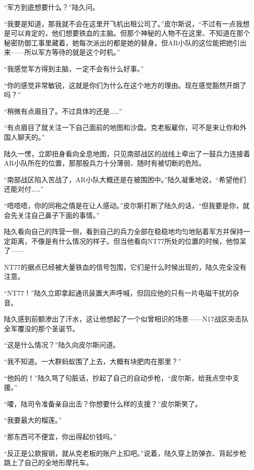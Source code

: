 “军方到底想要什么？”陆久问。

“我要是知道，那我就不会在这里开飞机出租公司了。”皮尔斯说，“不过有一点我想是可以肯定的，他们想要铁血的主脑。但那个神秘的人物不在这里、不知道在那个秘密防御工事里藏着，她每次派出的都是她的替身。但AR小队的这位能把她引出来——所以军方等待的就是这个时机。”

“我感觉军方得到主脑，一定不会有什么好事。”

“你的感觉非常敏锐，这就是你们为什么在这个地方的理由。现在感觉豁然开朗了吗？”

“稍微有点眉目了。不过具体的还是……”

“有点眉目了就关注一下自己面前的地图和沙盘。克老板雇你，可不是来让你和外国人聊天的。”

陆久一愣，立即扭身看向全息地图，只见南部战区的战线上牵出了一鼓兵力连接着AR小队所在的位置，那那股兵力十分薄弱、随时有被切断的危险。

“南部战区陷入苦战了，AR小队大概还是在被围困中。”陆久凝重地说，“希望他们还能对付……”

“唔唔唔，你的同袍之情是在让人感动。”皮尔斯打断了陆久的话，“但我要是你，就会先关注自己鼻子下面的事情。”

陆久看向自己的阵营一侧，看到自己的兵力全部在稳稳地均匀地贴着军方并保持一定距离，不像是有什么情况的样子。但当他看向NT77所处的位置的时候，他惊呆了——

NT77的据点已经被大量铁血的信号包围，它们是什么时候出现的，陆久完全没有注意。

“NT77！”陆久立即拿起通讯装置大声呼喊，但回应他的只有一片电磁干扰的杂音。

陆久感到前额渗出了汗水，这让他想起了一个似曾相识的场景——N17战区突击队全军覆没的那个圣诞节。

“这是什么情况？”陆久向皮尔斯问道。

“我不知道。一大群蚂蚁围了上去，大概有块肥肉在那里？”

“他妈的！”陆久骂了句脏话，抄起了自己的自动步枪，“皮尔斯，给我点空中支援。”

“嚯，陆司令准备亲自出击？你想要什么样的支援？”皮尔斯笑了。

“我要最大的榴莲。”

“那东西可不便宜，你出得起价钱吗。”

“反正是公款报销，就从克老板的账户上扣吧。”说着，陆久穿上防弹衣、背起步枪跳上了自己的全地形摩托车。